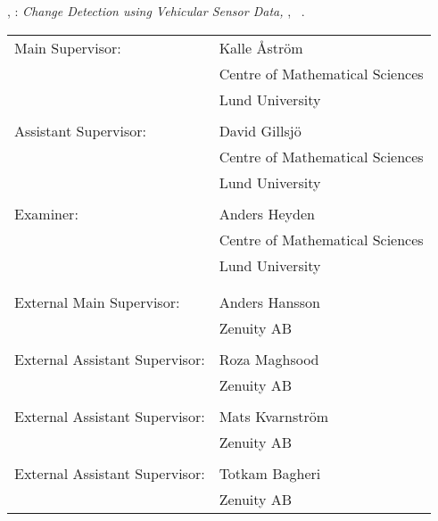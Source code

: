 \thispagestyle{empty}
\rmfamily

\hfill

\vfill

\noindent\myNameFanny, \myNameLina:
\textit{Change Detection using Vehicular Sensor Data,} \mySubTitle,
\textcopyright\ \myTime.
\vspace{1cm}

\noindent
\begin{table}[H]
\begin{tabular}{ll}


Main Supervisor:          & Kalle Åström                    \\
                          & Centre of Mathematical Sciences \\
                          & Lund University                 \\
                          &                                 \\
Assistant Supervisor:     & David Gillsjö                   \\
                          & Centre of Mathematical Sciences \\
                          & Lund University                 \\
                          &                                 \\
Examiner:                 & Anders Heyden                   \\
                          & Centre of Mathematical Sciences \\
                          & Lund University                 \\
                          &                                 \\
                          &                                 \\
External Main Supervisor:      & Anders Hansson                  \\
                          & Zenuity AB                      \\
                          &                                 \\
External Assistant Supervisor: & Roza Maghsood                   \\
                          & Zenuity AB                      \\
                          &                                 \\
External Assistant Supervisor: & Mats Kvarnström                 \\
                          & Zenuity AB                      \\
                          &                                 \\
External Assistant Supervisor: & Totkam Bagheri                  \\
                          & Zenuity AB                     
\end{tabular}
\end{table}


